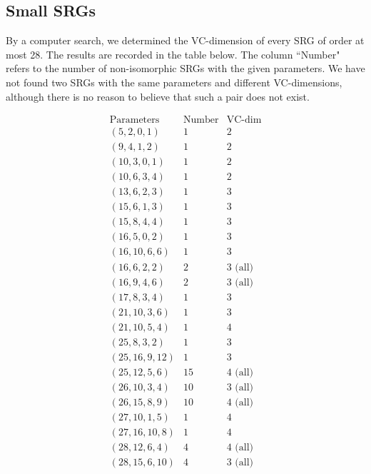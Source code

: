 \documentclass{article}
\theoremstyle{definition}
\def\john#1{\noindent
\textcolor{blue}
{\textsc{(John:}
\textsf{#1})}}
\begin{document}
\subsection{Small SRGs} \label{Section Small SRGs}
By a computer search, we determined the VC-dimension of every SRG of order at most 28. The results are recorded in the table below. The column ``Number" refers to the number of non-isomorphic SRGs with the given parameters. We have not found two SRGs with the same parameters and different VC-dimensions, although there is no reason to believe that such a pair does not exist.

\[ \begin{array}{c|c|c}
\text{Parameters} & \text{Number} & \text{VC-dim} \\ \hline{}
    (5,2,0,1) & 1 & 2  \\
    (9,4,1,2) & 1 & 2  \\
    (10,3,0,1) & 1 & 2  \\
    (10,6,3,4) & 1 & 2  \\
    (13, 6, 2, 3) & 1 & 3  \\
    (15,6,1,3) & 1 & 3  \\
    (15,8,4,4) & 1 & 3 \\
    (16,5,0,2) & 1 & 3  \\
    (16,10,6,6) & 1 & 3  \\
    (16,6,2,2) & 2 & 3 \text{ (all)}  \\
    (16,9,4,6) & 2 & 3 \text{ (all)}  \\
    (17,8,3,4) & 1 & 3  \\
    (21,10,3,6) & 1 & 3  \\
    (21,10,5,4) & 1 & 4  \\
    (25,8,3,2) & 1 & 3  \\
    (25,16,9,12) & 1 & 3  \\
    (25,12,5,6) & 15 & 4 \text{ (all)} \\
    (26,10,3,4) & 10 & 3 \text{ (all)} \\
    (26,15,8,9) & 10 & 4 \text{ (all)} \\
    (27,10,1,5) & 1 & 4 \\
    (27,16,10,8) & 1 & 4 \\
    (28,12,6,4) & 4 & 4 \text{ (all)} \\
    (28,15,6,10) & 4 & 3 \text{ (all)} \\
\end{array} \]

\end{document}
